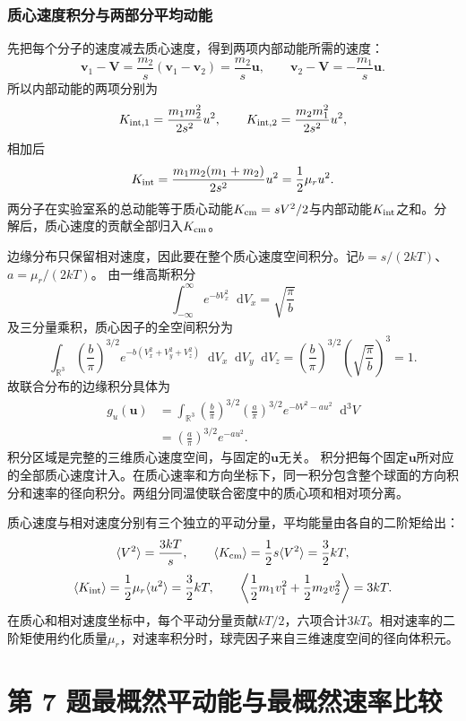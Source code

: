 \documentclass[UTF8,fontset=fandol,a4paper,11pt]{ctexart}
\newcommand{\dd}{\mathop{}\!\mathrm{d}}
\begin{document}
\subsubsection*{质心速度积分与两部分平均动能}
先把每个分子的速度减去质心速度，得到两项内部动能所需的速度：
\[
\bm v_1-\bm V=\frac{m_2}{s}(\bm v_1-\bm v_2)
=\frac{m_2}{s}\bm u,\qquad
\bm v_2-\bm V=-\frac{m_1}{s}\bm u.
\]
所以内部动能的两项分别为
\[
K_{\rm int,1}=\frac{m_1m_2^2}{2s^2}u^2,\qquad
K_{\rm int,2}=\frac{m_2m_1^2}{2s^2}u^2,
\]
相加后
\[
K_{\rm int}=\frac{m_1m_2(m_1+m_2)}{2s^2}u^2
=\frac12\mu_ru^2.
\]
两分子在实验室系的总动能等于质心动能$K_{\rm cm}=sV^2/2$与内部动能$K_{\rm int}$之和。分解后，质心速度的贡献全部归入$K_{\rm cm}$。

边缘分布只保留相对速度，因此要在整个质心速度空间积分。记$b=s/(2kT)$、$a=\mu_r/(2kT)$。
由一维高斯积分
\[
\int_{-\infty}^\infty e^{-bV_x^2}\dd V_x=\sqrt{\frac\pi b}
\]
及三分量乘积，质心因子的全空间积分为
\[
\int_{\mathbb R^3}\left(\frac b\pi\right)^{3/2}
e^{-b(V_x^2+V_y^2+V_z^2)}\dd V_x\dd V_y\dd V_z
=\left(\frac b\pi\right)^{3/2}
\left(\sqrt{\frac\pi b}\right)^3=1.
\]
故联合分布的边缘积分具体为
\[
\begin{aligned}
g_u(\bm u)
&=\int_{\mathbb R^3}
\left(\frac b\pi\right)^{3/2}
\left(\frac a\pi\right)^{3/2}
e^{-bV^2-au^2}\dd^3V\\
&=\left(\frac a\pi\right)^{3/2}e^{-au^2}.
\end{aligned}
\]
积分区域是完整的三维质心速度空间，与固定的$\bm u$无关。
积分把每个固定$\bm u$所对应的全部质心速度计入。在质心速率和方向坐标下，同一积分包含整个球面的方向积分和速率的径向积分。两组分同温使联合密度中的质心项和相对项分离。

质心速度与相对速度分别有三个独立的平动分量，平均能量由各自的二阶矩给出：
\[
\langle V^2\rangle=\frac{3kT}{s},\qquad
\langle K_{\rm cm}\rangle=\frac12s\langle V^2\rangle=\frac32kT,
\]
\[
\langle K_{\rm int}\rangle
=\frac12\mu_r\langle u^2\rangle=\frac32kT,\qquad
\left\langle\frac12m_1v_1^2+\frac12m_2v_2^2\right\rangle=3kT.
\]
在质心和相对速度坐标中，每个平动分量贡献$kT/2$，六项合计$3kT$。相对速率的二阶矩使用约化质量$\mu_r$，对速率积分时，球壳因子来自三维速度空间的径向体积元。





\section*{第 7 题\quad 最概然平动能与最概然速率比较}
\end{document}
